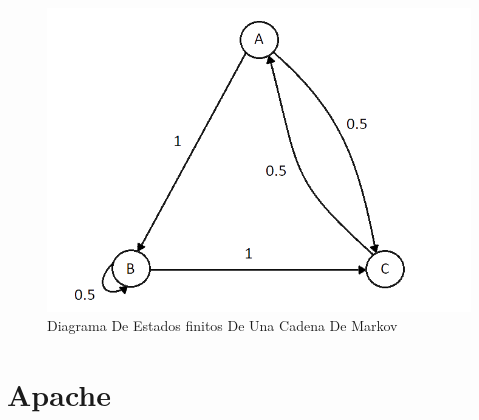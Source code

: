 \documentclass[12pt, a4paper, titlepage]{report}
\begin{document}
		\begin{figure}[H]
			\includegraphics[width=12cm]{./imagenes/MarcoTeorico/Markov/CMarkov.png}
			\centering 
			\caption{Diagrama De Estados finitos De Una Cadena De Markov \cite{refMarkov}}
		\end{figure}

	    \section{Apache}
	    
\end{document}
